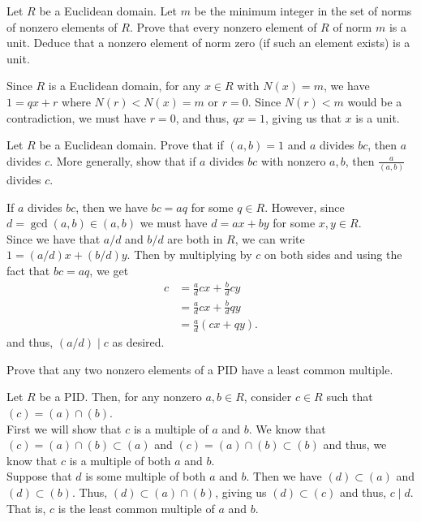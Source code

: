 \documentclass[12 pt, letterpaper]{hmcpset}
\begin{document}
\begin{problem}
	Let $R$ be a Euclidean domain. Let $m$ be the minimum integer in the set of norms of nonzero elements of $R$. Prove that every nonzero element of $R$ of norm $m$ is a unit. Deduce that a nonzero element of norm zero (if such an element exists) is a unit.
\end{problem}

\begin{solution}
	Since $R$ is a Euclidean domain, for any $x \in R$ with $N(x) = m$, we have $1 = qx + r$ where $N(r) < N(x) = m$ or $r = 0$. Since $N(r) < m$ would be a contradiction, we must have $r = 0$, and thus, $qx = 1$, giving us that $x$ is a unit.
\end{solution}

\pagebreak

\begin{problem}
	Let $R$ be a Euclidean domain. Prove that if $(a, b) = 1$ and $a$ divides $bc$, then $a$ divides $c$. More generally, show that if $a$ divides $bc$ with nonzero $a, b$, then $\frac{a}{(a, b)}$ divides $c$.
\end{problem}

\begin{solution}
	If $a$ divides $bc$, then we have $bc = a q$ for some $q \in R$. However, since $d = \gcd (a, b) \in (a, b)$ we must have $d = ax + by$ for some $x, y \in R$. \\
	
	Since we have that $a/d$ and $b/d$ are both in $R$, we can write $1 = (a/d)x + (b/d)y$. Then by multiplying by $c$ on both sides and using the fact that $bc = aq$, we get
	\[
		\begin{split}
			c & = \frac{a}{d} cx + \frac{b}{d} cy \\
			  & = \frac{a}{d} cx + \frac{b}{d} qy \\
			  & = \frac{a}{d} (cx + qy).
		\end{split}
	\]
	and thus, $(a/d) \mid c$ as desired.
\end{solution}

\pagebreak

\begin{problem}
	Prove that any two nonzero elements of a PID have a least common multiple.
\end{problem}

\begin{solution}
	Let $R$ be a PID. Then, for any nonzero $a, b \in R$, consider $c \in R$ such that $(c) = (a) \cap (b)$. \\

	First we will show that $c$ is a multiple of $a$ and $b$. We know that $(c) = (a) \cap (b) \subset (a)$ and $(c) = (a) \cap (b) \subset (b)$ and thus, we know that $c$ is a multiple of both $a$ and $b$. \\

	Suppose that $d$ is some multiple of both $a$ and $b$. Then we have $(d) \subset (a)$ and $(d) \subset (b)$. Thus, $(d) \subset (a) \cap (b)$, giving us $(d) \subset (c)$ and thus, $c \mid d$. That is, $c$ is the least common multiple of $a$ and $b$.
\end{solution}
\end{document}
